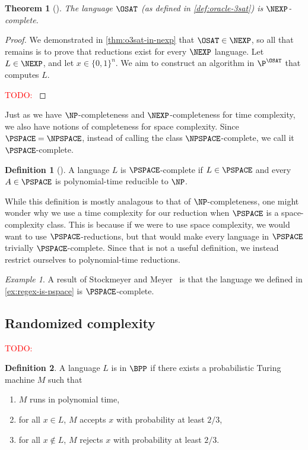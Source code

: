 \documentclass[english,12pt]{reedthesis}
\theoremstyle{plain}
\newtheorem{thm}{Theorem}[section]
\theoremstyle{definition}
\newtheorem{defn}[defn]{Definition}
\theoremstyle{remark}
\newtheorem{example}{Example}[thm]
\newcommand{\TODO}[1]{\textcolor{red}{TODO: #1}}
\begin{document}
\begin{thm}[{\cite[Proposition 4.2]{BFL90}}]\label{thm:o3sat-nexp-complete}
  The language $\OSAT$ (as defined in \cref{def:oracle-3sat}) is
  $\NEXP$-complete.
\end{thm}

\begin{proof}
  We demonstrated in \cref{thm:o3sat-in-nexp} that $\OSAT \in \NEXP$, so all that
  remains is to prove that reductions exist for every $\NEXP$ language. Let
  $L \in \NEXP$, and let $x \in \{0, 1\}^{n}$. We aim to construct an algorithm in
  $\P^{\OSAT}$ that computes $L$.

  \TODO{}
\end{proof}

Just as we have $\NP$-completeness and $\NEXP$-completeness for time complexity,
we also have notions of completeness for space complexity. Since
$\PSPACE = \NPSPACE$, instead of calling the class $\NPSPACE$-complete, we call
it $\PSPACE$-complete.

\begin{defn}[{\cite[Def.\ 8.8]{Sip97}}]\label{def:pspace-complete}
  A language $L$ is $\PSPACE$-complete if $L \in \PSPACE$ and every $A \in \PSPACE$
  is polynomial-time reducible to $\NP$.
\end{defn}

While this definition is mostly analagous to that of $\NP$-completeness, one
might wonder why we use a time complexity for our reduction when $\PSPACE$ is a
space-complexity class. This is because if we were to use space complexity, we
would want to use $\PSPACE$-reductions, but that would make every language in
$\PSPACE$ trivially $\PSPACE$-complete. Since that is not a useful definition,
we instead restrict ourselves to polynomial-time reductions.

\begin{example}
  A result of Stockmeyer and Meyer~\cite{SM73} is that the language we defined
  in \cref{ex:regex-is-pspace} is $\PSPACE$-complete.
\end{example}

\subsection{Randomized complexity}\label{sec:rand-complexity}

\TODO{}

\begin{defn}\label{def:bpp}
  A language $L$ is in $\BPP$ if there exists a probabilistic Turing machine $M$
  such that
  \begin{enumerate}
    \item $M$ runs in polynomial time,
    \item for all $x \in L$, $M$ accepts $x$ with probability at least $2/3$,
    \item for all $x \notin L$, $M$ rejects $x$ with probability at least $2/3$.
  \end{enumerate}
\end{defn}
\end{document}
